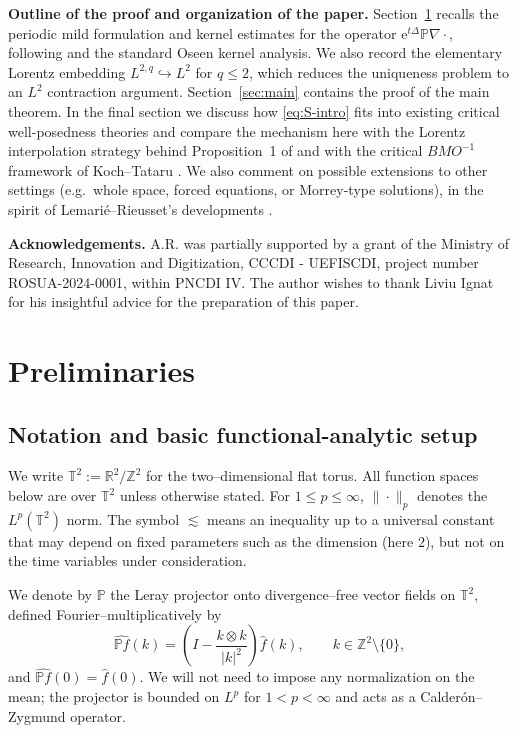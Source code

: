 \documentclass[12pt]{article}
\newcommand{\R}{\mathbb{R}}
\newcommand{\T}{\mathbb{T}}
\newcommand{\Z}{\mathbb{Z}}
\theoremstyle{remark}
\theoremstyle{remark}
\begin{document}
\medskip

\noindent\textbf{Outline of the proof and organization of the paper.}
Section~\ref{sec:prelim} recalls the periodic mild formulation and kernel estimates for the operator
$\mathrm{e}^{t\Delta}\mathbb{P}\nabla\cdot$, following \cite{LemarieRieusset2025HighlySingular} and the standard Oseen kernel analysis.
We also record the elementary Lorentz embedding $L^{2,q}\hookrightarrow L^2$ for $q\le 2$, which reduces
the uniqueness problem to an $L^2$ contraction argument.
Section~\ref{sec:main} contains the proof of the main theorem.
In the final section we discuss how \eqref{eq:S-intro} fits into existing critical well-posedness theories
and compare the mechanism here with the Lorentz interpolation strategy behind Proposition~1 of \cite{LemarieRieusset2025HighlySingular}
and with the critical $BMO^{-1}$ framework of Koch--Tataru \cite{KochTataru2001}. We also comment on possible
extensions to other settings (e.g.\ whole space, forced equations, or Morrey-type solutions), in the spirit
of Lemari\'e--Rieusset's developments \cite{LemarieMorrey2007,LemariePrioux2009,LemarieBook2023}.

\medskip

\noindent\textbf{Acknowledgements.} A.R. was partially supported by a grant of the Ministry of Research, Innovation and Digitization, CCCDI - UEFISCDI, project number ROSUA-2024-0001, within PNCDI IV.  The author wishes to thank Liviu Ignat for his insightful advice for the preparation of this paper.

\bigskip

\section{Preliminaries}\label{sec:prelim}

\subsection{Notation and basic functional-analytic setup}

We write $\T^2:=\R^2/\Z^2$ for the two--dimensional flat torus. All function spaces below
are over $\T^2$ unless otherwise stated. For $1\le p\le\infty$, $\|\cdot\|_{p}$ denotes the
$L^p(\T^2)$ norm. The symbol $\lesssim$ means an inequality up to a universal constant
that may depend on fixed parameters such as the dimension (here $2$), but not on the time variables
under consideration.

We denote by $\mathbb P$ the Leray projector onto divergence--free vector fields on $\T^2$,
defined Fourier--multiplicatively by
\[
\widehat{\mathbb P f}(k) = \left(I - \frac{k\otimes k}{|k|^2}\right)\widehat f(k),
\qquad k\in\Z^2\setminus\{0\},
\]
and $\widehat{\mathbb P f}(0)=\widehat f(0)$. We will not need to impose any normalization on the mean;
the projector is bounded on $L^p$ for $1<p<\infty$ and acts as a Calder\'on--Zygmund operator.
\end{document}
